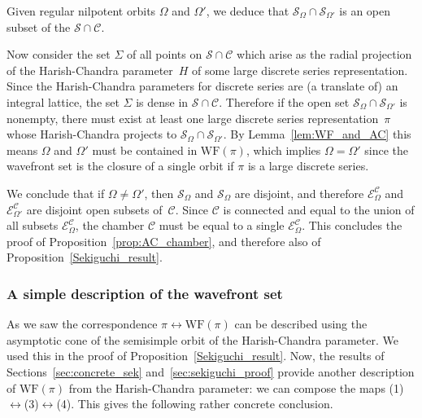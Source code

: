 \documentclass[10pt,leqno]{article}
\numberwithin{equation}{section}
\newcommand{\WF}{\mathrm{WF}}
\newcommand{\ECom}{\mathcal{E}^{\mathcal{C}}_\Omega}
\begin{document}
Given regular nilpotent orbits $\Omega$ and $\Omega'$, we deduce that $\mathcal{S}_\Omega \cap \mathcal{S}_{\Omega'}$ is an open subset of the $\mathcal{S} \cap \mathcal{C}$.

Now consider the set $\Sigma$ of all points on $\mathcal{S} \cap \mathcal{C}$ which arise as the radial projection of the Harish-Chandra parameter~$H$ of some large discrete series representation. Since the Harish-Chandra parameters for discrete series are (a translate of) an integral lattice, the set $\Sigma$ is dense in $\mathcal{S} \cap \mathcal{C}$. Therefore if the open set $\mathcal{S}_\Omega \cap \mathcal{S}_{\Omega'}$ is nonempty, there must exist at least one large discrete series representation~$\pi$ whose Harish-Chandra projects to $\mathcal{S}_\Omega \cap \mathcal{S}_{\Omega'}$. By Lemma~\ref{lem:WF_and_AC} this means $\Omega$ and $\Omega'$ must be contained in $\WF(\pi)$, which implies $\Omega = \Omega'$ since the wavefront set is the closure of a single orbit if $\pi$ is a large discrete series. 

We conclude that if $\Omega \neq \Omega'$, then $\mathcal{S}_\Omega$ and $\mathcal{S}_\Omega$ are disjoint, and therefore $\ECom$ and $\mathcal{E}^{\mathcal{C}}_{\Omega'}$ are disjoint open subsets of~$\mathcal{C}$. Since $\mathcal{C}$ is connected and equal to the union of all subsets $\mathcal{E}^{\mathcal{C}}_{\Omega}$, the chamber $\mathcal{C}$ must be equal to a single $\ECom$. This concludes the proof of Proposition~\ref{prop:AC_chamber}, and therefore also of Proposition~\ref{Sekiguchi_result}.


\subsubsection{A simple description of the wavefront set}\label{sec:alternate_WF}


As we saw the correspondence $\pi \leftrightarrow \WF(\pi)$ can be described using the asymptotic cone of the semisimple orbit of the Harish-Chandra parameter. We used this in the proof of Proposition~\ref{Sekiguchi_result}. Now, the results of Sections~\ref{sec:concrete_sek} and~\ref{sec:sekiguchi_proof} provide another description of $\WF(\pi)$ from the Harish-Chandra parameter: we can compose the maps (1)$\leftrightarrow$(3)$\leftrightarrow$(4). This gives the following rather concrete conclusion.
\end{document}
